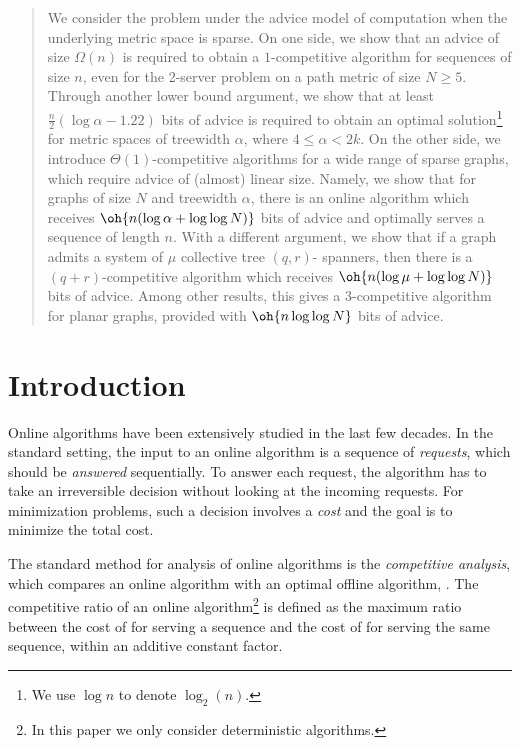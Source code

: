 
\begin{abstract}
We consider the {\ks}problem under the advice model of computation when the underlying metric space is sparse. On one side, we show that an advice of size $\Omega(n)$ is required to obtain a $1$-competitive algorithm for sequences of size $n$, even for the 2-server problem on a path metric of size $N \geq 5$. Through another lower bound argument, we show that at least $\frac{n}{2}(\log \alpha- 1.22)$ bits of advice is required to obtain an optimal solution\footnote{We use $\log n$ to denote $\log_2(n)$.} for metric spaces of treewidth $\alpha$, where $4 \leq \alpha < 2k$. On the other side, we introduce $\Theta(1)$-competitive algorithms for a wide range of sparse graphs, which require advice of (almost) linear size. Namely, we show that for graphs of size $N$ and treewidth $\alpha$, there is an online algorithm which receives $\oh{n (\log \alpha + \log \log N)}$ bits of advice and optimally serves a sequence of length $n$. With a different argument, we show that if a graph admits a system of $\mu$ collective tree $(q,r)$-
spanners, then there is a $(q+r)$-competitive algorithm which receives $\oh{n (\log \mu + \log \log N)}$ bits of advice. Among other results, this gives a $3$-competitive algorithm for planar graphs, provided with $\oh{n \log \log N}$ bits of advice. 
\end{abstract}



\section{Introduction}\label{secIntro}
Online algorithms have been extensively studied in the last few decades. In the standard setting, the input to an online algorithm is a sequence of \textit{requests}, which should be \textit{answered} sequentially. To answer each request, the algorithm has to take an irreversible decision without looking at the incoming requests. For minimization problems, such a decision involves a \textit{cost} and the goal is to minimize the total cost. 

The standard method for analysis of online algorithms is the \textit{competitive analysis}, which compares an online algorithm with an optimal offline algorithm, \OPT. The competitive ratio of an online algorithm\footnote{In this paper we only consider deterministic algorithms.} \ALG is defined as the maximum ratio between the cost of \ALG for serving a sequence and the cost of \OPT for serving the same sequence, within an additive constant factor. 

